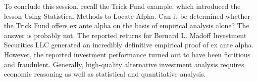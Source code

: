 \documentclass[11pt]{article}
\begin{document}
To conclude this session, recall the Trick Fund example, which introduced the lesson Using Statistical Methods to Locate Alpha. Can it be determined whether the Trick Fund offers ex ante alpha on the basis of empirical analysis alone? The answer is probably not. The reported returns for Bernard L. Madoff Investment Securities LLC generated an incredibly definitive empirical proof of ex ante alpha. However, the reported investment performance turned out to have been fictitious and fraudulent. Generally, high-quality alternative investment analysis requires economic reasoning as well as statistical and quantitative analysis.
\end{document}
